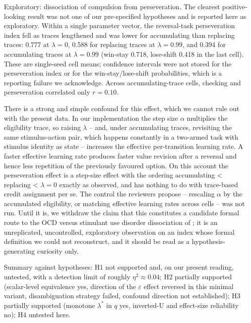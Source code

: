 \documentclass[11pt,a4paper]{article}
\begin{document}
Exploratory: dissociation of compulsion from perseveration. The clearest positive-looking result was not one of our pre-specified hypotheses and is reported here as exploratory. Within a single parameter vector, the reversal-task perseveration index fell as traces lengthened and was lower for accumulating than replacing traces: 0.777 at $\lambda=0$, 0.588 for replacing traces at $\lambda=0.99$, and 0.394 for accumulating traces at $\lambda=0.99$ (win-stay 0.718, lose-shift 0.418 in the last cell). These are single-seed cell means; confidence intervals were not stored for the perseveration index or for the win-stay/lose-shift probabilities, which is a reporting failure we acknowledge. Across accumulating-trace cells, checking and perseveration correlated only $r=0.10$.

There is a strong and simple confound for this effect, which we cannot rule out with the present data. In our implementation the step size $\alpha$ multiplies the eligibility trace, so raising $\lambda$ -- and, under accumulating traces, revisiting the same stimulus-action pair, which happens constantly in a two-armed task with stimulus identity as state -- increases the effective per-transition learning rate. A faster effective learning rate produces faster value revision after a reversal and hence less repetition of the previously favoured option. On this account the perseveration effect is a step-size effect with the ordering accumulating \textless{} replacing \textless{} $\lambda = 0$ exactly as observed, and has nothing to do with trace-based credit assignment per se. The control the reviewers propose -- rescaling $\alpha$ by the accumulated eligibility, or matching effective learning rates across cells -- was not run. Until it is, we withdraw the claim that this constitutes a candidate formal route to the OCD versus stimulant use disorder dissociation of \citet{kanen2019computational}; it is an unreplicated, uncontrolled, exploratory observation on an index whose formal definition we could not reconstruct, and it should be read as a hypothesis-generating curiosity only.

Summary against hypotheses: H1 not supported and, on our present reading, untested, with a detection limit of roughly $\eta^2 \approx 0.04$; H2 partially supported (scalar-level equivalence yes, direction of the $\varepsilon$ effect reversed in this minimal variant, disambiguation strategy failed, confound direction not established); H3 partially supported (monotone $\lambda^{*}$ in $q$ yes, inverted-U and effect-size reliability no); H4 untested here.
\end{document}
